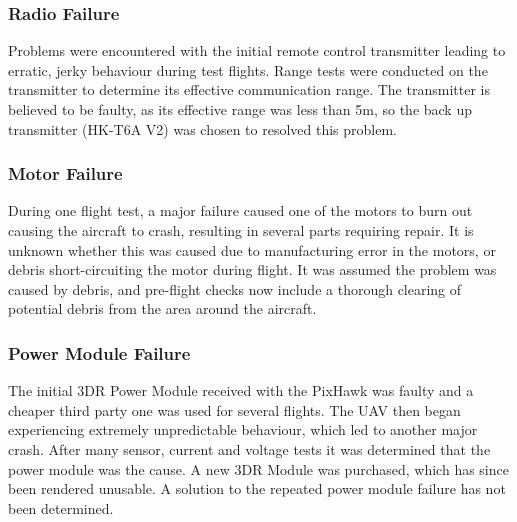 \subsubsection*{Radio Failure}
Problems were encountered with the initial remote control transmitter leading to erratic, jerky behaviour during test flights. Range tests were conducted on the transmitter to determine its effective communication range. The transmitter is believed to be faulty, as its effective range was less than 5m, so the back up transmitter (HK-T6A V2) was chosen to resolved this problem.

\subsubsection*{Motor Failure}
During one flight test, a major failure caused one of the motors to burn out causing the aircraft to crash, resulting in several parts requiring repair. It is unknown whether this was caused due to manufacturing error in the motors, or debris short-circuiting the motor during flight. It was assumed the problem was caused by debris, and pre-flight checks now include a thorough clearing of potential debris from the area around the aircraft.

\subsubsection*{Power Module Failure}
The initial 3DR Power Module received with the PixHawk was faulty and a cheaper third party one was used for several flights. The UAV then began experiencing extremely unpredictable behaviour, which led to another major crash. After many sensor, current and voltage tests it was determined that the power module was the cause. A new 3DR Module was purchased, which has since been rendered unusable. A solution to the repeated power module failure has not been determined.